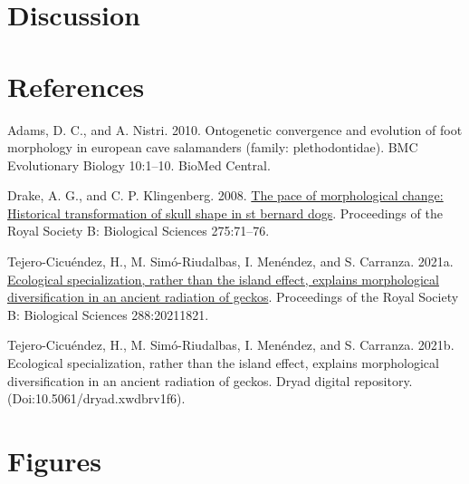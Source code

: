 \documentclass[
]{article}
\newlength{\cslhangindent}
\newlength{\cslentryspacingunit} %
\newenvironment{CSLReferences}[2] %
 {%
  \setlength{\parindent}{0pt}
  \ifodd #1
  \let\oldpar\par
  \def\par{\hangindent=\cslhangindent\oldpar}
  \fi
  \setlength{\parskip}{#2\cslentryspacingunit}
 }%
 {}
\begin{document}
\hypertarget{discussion}{%
\section{Discussion}\label{discussion}}

\newpage

\hypertarget{references}{%
\section*{References}\label{references}}

\setlength{\parindent}{-0.25in} \setlength{\leftskip}{0.25in}
\setlength{\parskip}{8pt} \noindent

\hypertarget{refs}{}
\begin{CSLReferences}{1}{0}
\leavevmode{}%
Adams, D. C., and A. Nistri. 2010. Ontogenetic convergence and evolution
of foot morphology in european cave salamanders (family:
plethodontidae). BMC Evolutionary Biology 10:1--10. BioMed Central.

\leavevmode{}%
Drake, A. G., and C. P. Klingenberg. 2008.
\href{https://doi.org/10.1098/rspb.2007.1169}{The pace of morphological
change: Historical transformation of skull shape in st bernard dogs}.
Proceedings of the Royal Society B: Biological Sciences 275:71--76.

\leavevmode{}%
Tejero-Cicuéndez, H., M. Simó-Riudalbas, I. Menéndez, and S. Carranza.
2021a. \href{https://doi.org/10.1098/rspb.2021.1821}{Ecological
specialization, rather than the island effect, explains morphological
diversification in an ancient radiation of geckos}. Proceedings of the
Royal Society B: Biological Sciences 288:20211821.

\leavevmode{}%
Tejero-Cicuéndez, H., M. Simó-Riudalbas, I. Menéndez, and S. Carranza.
2021b. Ecological specialization, rather than the island effect,
explains morphological diversification in an ancient radiation of
geckos. Dryad digital repository. (Doi:10.5061/dryad.xwdbrv1f6).

\end{CSLReferences}

\newpage

\hypertarget{figures}{%
\section{Figures}\label{figures}}
\end{document}
